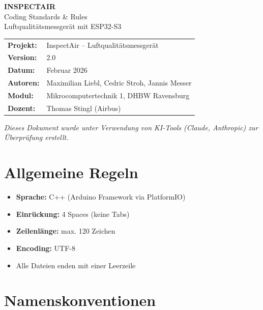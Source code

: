 \documentclass[a4paper,11pt]{article}
\begin{document}
\begin{center}
{\LARGE\textbf{INSPECTAIR}}\\[0.3cm]
{\Large Coding Standards \& Rules}\\[0.3cm]
{\large Luftqualitätsmessgerät mit ESP32-S3}\\[0.5cm]
\begin{tabular}{ll}
\textbf{Projekt:} & InspectAir -- Luftqualitätsmessgerät \\
\textbf{Version:} & 2.0 \\
\textbf{Datum:} & Februar 2026 \\
\textbf{Autoren:} & Maximilian Liebl, Cedric Stroh, Jannis Messer \\
\textbf{Modul:} & Mikrocomputertechnik 1, DHBW Ravensburg \\
\textbf{Dozent:} & Thomas Stingl (Airbus) \\
\end{tabular}
\end{center}

\vspace{0.5cm}
\noindent\textit{Dieses Dokument wurde unter Verwendung von KI-Tools (Claude, Anthropic) zur Überprüfung erstellt.}
\vspace{0.3cm}

\tableofcontents
\newpage

\section{Allgemeine Regeln}

\begin{itemize}[leftmargin=2em]
    \item \textbf{Sprache:} C++ (Arduino Framework via PlatformIO)
    \item \textbf{Einrückung:} 4 Spaces (keine Tabs)
    \item \textbf{Zeilenlänge:} max. 120 Zeichen
    \item \textbf{Encoding:} UTF-8
    \item Alle Dateien enden mit einer Leerzeile
\end{itemize}

\section{Namenskonventionen}
\end{document}
